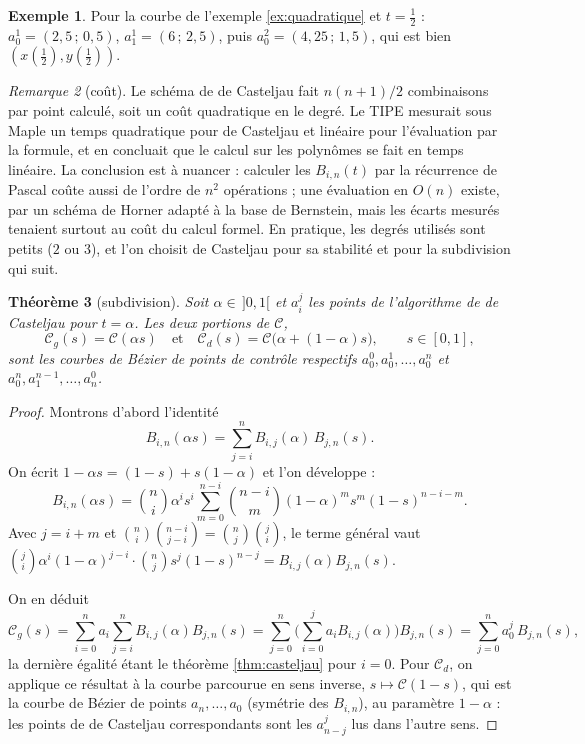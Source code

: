 \documentclass[11pt,a4paper]{article}
\theoremstyle{plain}
\newtheorem{theoreme}{Théorème}[section]
\theoremstyle{definition}
\newtheorem{exemple}[theoreme]{Exemple}
\theoremstyle{remark}
\newtheorem{remarque}[theoreme]{Remarque}
\newcommand{\C}{\mathcal{C}}
\begin{document}
\begin{exemple}
Pour la courbe de l'exemple \ref{ex:quadratique} et $t=\frac12$ : $a_0^1=(2{,}5\,;\,0{,}5)$, $a_1^1=(6\,;\,2{,}5)$, puis $a_0^2=(4{,}25\,;\,1{,}5)$, qui est bien $(x(\frac12),y(\frac12))$.
\end{exemple}

\begin{remarque}[coût]
Le schéma de de Casteljau fait $n(n+1)/2$ combinaisons par point calculé, soit un coût quadratique en le degré. Le TIPE mesurait sous Maple un temps quadratique pour de Casteljau et linéaire pour l'évaluation par la formule, et en concluait que le calcul sur les polynômes se fait en temps linéaire. La conclusion est à nuancer : calculer les $B_{i,n}(t)$ par la récurrence de Pascal coûte aussi de l'ordre de $n^2$ opérations ; une évaluation en $O(n)$ existe, par un schéma de Horner adapté à la base de Bernstein, mais les écarts mesurés tenaient surtout au coût du calcul formel. En pratique, les degrés utilisés sont petits ($2$ ou $3$), et l'on choisit de Casteljau pour sa stabilité et pour la subdivision qui suit.
\end{remarque}

\begin{theoreme}[subdivision]\label{thm:subdivision}
Soit $\alpha\in\,]0,1[$ et $a_i^j$ les points de l'algorithme de de Casteljau pour $t=\alpha$. Les deux portions de $\C$,
\[
  \C_g(s)=\C(\alpha s)\quad\text{et}\quad\C_d(s)=\C\big(\alpha+(1-\alpha)s\big),\qquad s\in[0,1],
\]
sont les courbes de Bézier de points de contrôle respectifs $a_0^0,a_0^1,\dots,a_0^n$ et $a_0^n,a_1^{n-1},\dots,a_n^0$.
\end{theoreme}

\begin{proof}
Montrons d'abord l'identité
\[
  B_{i,n}(\alpha s)=\sum_{j=i}^nB_{i,j}(\alpha)\,B_{j,n}(s) .
\]
On écrit $1-\alpha s=(1-s)+s(1-\alpha)$ et l'on développe :
\[
  B_{i,n}(\alpha s)=\binom ni\alpha^is^i\sum_{m=0}^{n-i}\binom{n-i}m(1-\alpha)^ms^m(1-s)^{n-i-m} .
\]
Avec $j=i+m$ et $\binom ni\binom{n-i}{j-i}=\binom nj\binom ji$, le terme général vaut $\binom ji\alpha^i(1-\alpha)^{j-i}\cdot\binom njs^j(1-s)^{n-j}=B_{i,j}(\alpha)B_{j,n}(s)$.

On en déduit
\[
  \C_g(s)=\sum_{i=0}^na_i\sum_{j=i}^nB_{i,j}(\alpha)B_{j,n}(s)=\sum_{j=0}^n\Big(\sum_{i=0}^ja_iB_{i,j}(\alpha)\Big)B_{j,n}(s)=\sum_{j=0}^na_0^j\,B_{j,n}(s),
\]
la dernière égalité étant le théorème \ref{thm:casteljau} pour $i=0$. Pour $\C_d$, on applique ce résultat à la courbe parcourue en sens inverse, $s\mapsto\C(1-s)$, qui est la courbe de Bézier de points $a_n,\dots,a_0$ (symétrie des $B_{i,n}$), au paramètre $1-\alpha$ : les points de de Casteljau correspondants sont les $a_{n-j}^j$ lus dans l'autre sens.
\end{proof}
\end{document}

